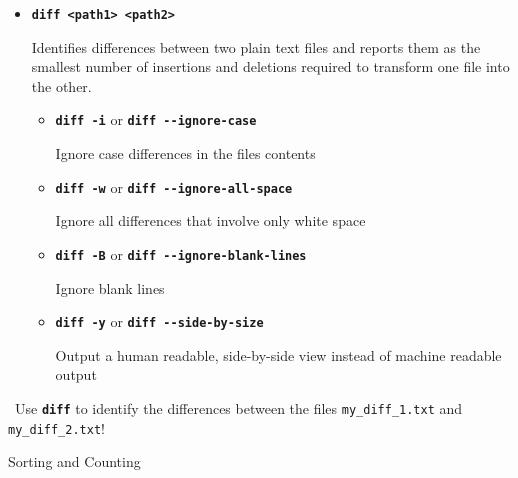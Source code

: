 \documentclass[aspectratio=1610]{beamer}
\newcommand\curtitle{}
\newcommand\command[1]{\alert{\textbf{\texttt{#1}}}}
\begin{document}

\begin{frame}[c]{\curtitle}
    \begin{itemize}[<+->]\setlength\itemsep{1em}
        \item \command{diff <path1> <path2>}

            Identifies differences between two plain text files and reports them as the smallest
            number of insertions and deletions required to transform one file into the other.
            \begin{itemize}[<.->]
                \item \command{diff -i} or \command{diff -{-}ignore-case}

                    Ignore case differences in the files contents
                \item \command{diff -w} or \command{diff -{-}ignore-all-space}

                    Ignore all differences that involve only white space
                \item \command{diff -B} or \command{diff -{-}ignore-blank-lines}

                    Ignore blank lines
                \item \command{diff -y} or \command{diff -{-}side-by-size}

                    Output a human readable, side-by-side view instead of machine readable output
            \end{itemize}
    \end{itemize}
\end{frame}

\begin{frame}[c]{\curtitle}
    \large \leftpointright\ Use \command{diff} to identify the differences between the files
    \alert{\texttt{my\_diff\_1.txt}} and \alert{\texttt{my\_diff\_2.txt}}!
\end{frame}

\renewcommand\curtitle{Sorting and Counting}

\begin{frame}[c]
    \Huge \curtitle
\end{frame}
\end{document}
